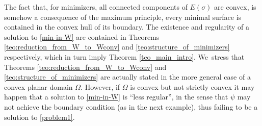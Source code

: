 \documentclass[JEP,XML,SOM,Unicode, NoFloatCountersInSection,published]{cedram}
\theoremstyle{definition}
\begin{document}
The fact that, for minimizers, all connected components of $E(\sigma)$ are convex, is somehow a consequence of the maximum principle, \ie every minimal surface is contained in the convex hull of its boundary.
The existence and regularity of a solution to \eqref{min-in-W} are contained in Theorems \ref{teo:reduction_from_W_to_Wconv} and \ref{teo:structure_of_minimizers}
respectively, which in turn imply Theorem \ref{teo_main_intro}. We~stress that Theorems \ref{teo:reduction_from_W_to_Wconv} and \ref{teo:structure_of_minimizers} are actually stated in the more general case of
a convex planar domain $\Omega$. However, if $\Omega$ is convex but not strictly convex it may happen that a solution to \eqref{min-in-W} is ``less regular'', in the sense that $\psi$ may not achieve the boundary condition (as in the next example),
thus failing to be a solution to \eqref{problem1}.
\end{document}
